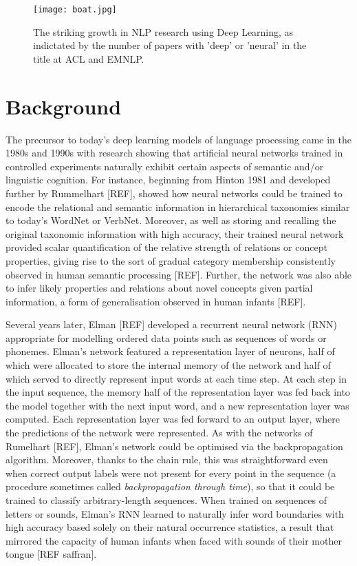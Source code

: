 \documentclass[11pt,letterpaper]{article}
\begin{document}
\begin{figure}
  \texttt{[image: boat.jpg]}
  \caption{The striking growth in NLP research using Deep Learning, as indictated by the number of papers with 'deep' or 'neural' in the title at ACL and EMNLP.}
  \label{fig:DLgrowth}
\end{figure}

\section{Background}

The precursor to today's deep learning models of language processing came in the 1980s and 1990s with research showing that artificial neural networks trained in controlled experiments naturally exhibit certain aspects of semantic and/or linguistic cognition. For instance, beginning from Hinton 1981 and developed further by Rummelhart [REF], showed how neural networks could be trained to encode the relational and semantic information in hierarchical taxonomies similar to today's WordNet or VerbNet. Moreover, as well as storing and recalling the original taxonomic information with high accuracy, their trained neural network provided scalar quantification of the relative strength of relations or concept properties, giving rise to the sort of gradual category membership consistently observed in human semantic processing [REF]. Further, the network was also able to infer likely properties and relations about novel concepts given partial information, a form of generalisation observed in human infants [REF]. 

Several years later, Elman [REF] developed a recurrent neural network (RNN) appropriate for modelling ordered data points such as sequences of words or phonemes. Elman's network featured a representation layer of neurons, half of which were allocated to store the internal memory of the network and half of which served to directly represent input words at each time step. At each step in the input sequence, the memory half of the representation layer was fed back into the model together with the next input word, and a new representation layer was computed. Each representation layer was fed forward to an output layer, where the predictions of the network were represented. As with the networks of Rumelhart [REF], Elman's network could be optimised via the backpropagation algorithm. Moreover, thanks to the chain rule, this was straightforward even when correct output labels were not present for every point in the sequence (a procedure sometimes called \emph{backpropagation through time}), so that it could be trained to classify arbitrary-length sequences. When trained on sequences of letters or sounds, Elman's RNN learned to naturally infer word boundaries with high accuracy based solely on their natural occurrence statistics, a result that mirrored the capacity of human infants when faced with sounds of their mother tongue [REF saffran]. 
\end{document}
